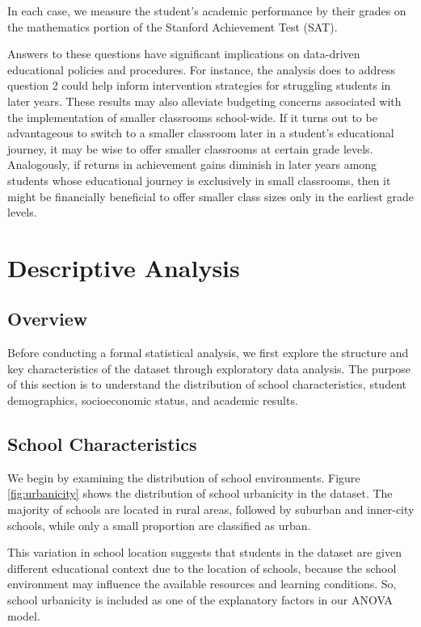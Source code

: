 \documentclass[11pt]{article}
\begin{document}
In each case, we measure the student's academic performance by their grades on the mathematics portion of the Stanford Achievement Test (SAT).

Answers to these questions have significant implications on data-driven educational policies and procedures. For instance, the analysis does to address question 2 could help inform intervention strategies for struggling students in later years. These results may also alleviate budgeting concerns associated with the implementation of smaller classrooms school-wide. If it turns out to be advantageous to switch to a smaller classroom later in a student's educational journey, it may be wise to offer smaller classrooms at certain grade levels. Analogously, if returns in achievement gains diminish in later years among students whose educational journey is exclusively in small classrooms, then it might be financially beneficial to offer smaller class sizes only in the earliest grade levels.

\section{Descriptive Analysis}\par
\label{section:descriptive}
\subsection{Overview}
Before conducting a formal statistical analysis, we first explore the structure and key characteristics of the dataset through exploratory data analysis. The purpose of this section is to understand the distribution of school characteristics, student demographics, socioeconomic status, and academic results. 
\subsection{School Characteristics}
We begin by examining the distribution of school environments.
Figure \ref{fig:urbanicity} shows the distribution of school urbanicity in the dataset. The majority of schools are located in rural areas, followed by suburban and inner-city schools, while only a small proportion are classified as urban.

This variation in school location suggests that students in the dataset are given different educational context due to the location of schools, because the school environment may influence the available resources and learning conditions. So, school urbanicity is included as one of the explanatory factors in our ANOVA model.
\end{document}
